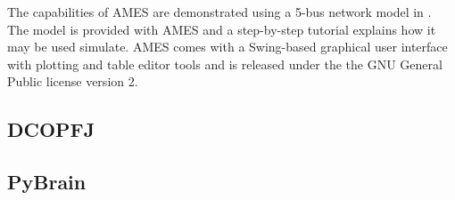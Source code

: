 The capabilities of AMES are demonstrated using a 5-bus network model in
\cite{tesfatsi:pes09}.  The model is provided with AMES and a step-by-step
tutorial explains how it may be used simulate.  AMES comes with a
Swing-based graphical user interface with plotting and table editor tools and
is released under the the GNU General Public license version 2.

\subsection{DCOPFJ}
\label{sec:dcopfj}

\subsection{PyBrain}
